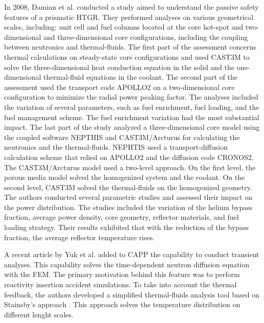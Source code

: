 In 2008, Damian et al. \cite{damian_vhtr_2008} conducted a study aimed to understand the passive safety features of a prismatic \gls{HTGR}.
They performed analyses on various geometrical scales, including: unit cell and fuel columns located at the core hot-spot and two-dimensional and three-dimensional core configurations, including the coupling between neutronics and thermal-fluids.
The first part of the assessment concerns thermal calculations on steady-state core configurations and used CAST3M \cite{studer_cast3marcturus_2007} to solve the three-dimensional heat conduction equation in the solid and the one-dimensional thermal-fluid equations in the coolant.
The second part of the assessment used the transport code APOLLO2 \cite{sanchez_apollo2_1999} on a two-dimensional core configuration to minimize the radial power peaking factor.
The analyses included the variation of several parameters, such as fuel enrichment, fuel loading, and the fuel management scheme.
The fuel enrichment variation had the most substantial impact.
The last part of the study analyzed a three-dimensional core model using the coupled software NEPTHIS \cite{cavalier_presentation_2005} and CAST3M/Arcturus for calculating the neutronics and the thermal-fluids.
NEPHTIS used a transport-diffusion calculation scheme that relied on APOLLO2 and the diffusion code CRONOS2.
The CAST3M/Arcturus model used a two-level approach.
On the first level, the porous media model solved the homogenized system and the coolant.
On the second level, CAST3M solved the thermal-fluids on the homogenized geometry.
The authors conducted several parametric studies and assessed their impact on the power distribution.
The studies included the variation of the helium bypass fraction, average power density, core geometry, reflector materials, and fuel loading strategy.
Their results exhibited that with the reduction of the bypass fraction, the average reflector temperature rises.

A recent article by Yuk et al. \cite{yuk_time-dependent_2020} added to CAPP the capability to conduct transient analyses.
This capability solves the time-dependent neutron diffusion equation with the \gls{FEM}.
The primary motivation behind this feature was to perform reactivity insertion accident simulations.
To take into account the thermal feedback, the authors developed a simplified thermal-fluids analysis tool based on Stainsby's approach \cite{stainsby_investigation_2008}.
This approach solves the temperature distribution on different lenght scales.


